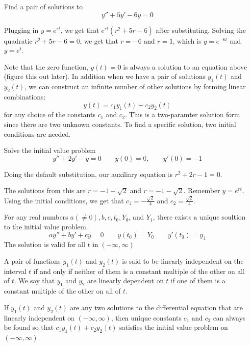 \documentclass[../diffeq.tex]{subfiles}
\begin{document}
\begin{example}
    Find a pair of solutions to 
    \[ y''+5y'-6y=0\]

    Plugging in $y=e^{rt}$, we get that $e^{rt}(r^2+5r-6)$ after substituting. Solving the quadratic $r^2+5r-6 =0$, we get that $r=-6$ and $r=1$, which is $y=e^{-6t}$ and $y=e^t$.
\end{example}

Note that the zero function, $y(t)=0$ is always a solution to an equation above (figure this out later). In addition when we have a pair of solutions $y_1(t)$ and $y_2(t)$, we can construct an infinite number of other solutions by forming linear combinations:
\[ y(t)=c_1y_1(t)+c_2y_2(t) \]
for any choice of the constants $c_1$ and $c_2$. This is a two-paramter solution form since there are two unknown constants. To find a specific solution, two initial conditions are needed.

\begin{example}
    Solve the initial value problem 
    \[ y''+2y'-y=0\qquad y(0)=0, \qquad y'(0)=-1 \]

    Doing the default substitution, our auxiliary equation is $r^2+2r-1=0$. 

    The solutions from this are $r=-1+\sqrt{2}$ and $r=-1-\sqrt{2}$. Remember $y=e^{rt}$. Using the initial conditions, we get that $c_1=-\frac{\sqrt{2}}{4}$ and $c_2=\frac{\sqrt{2}}{4}$.
\end{example}

\begin{theorem}
    For any real numbers $a(\neq 0),b,c,t_0,Y_0$, and $Y_1$, there exists a unique soultion to the initial value problem. 
    \[ ay''+by'+cy=0 \qquad y(t_0)=Y_0 \qquad y'(t_0)=y_1 \]
    The solution is valid for all $t$ in $(-\infty,\infty)$
\end{theorem}

\begin{definition}
    A pair of functions $y_1(t)$ and $y_2(t)$ is said to be linearly independent on the interval $t$ if and only if neither of them is a constant multiple of the other on all of $t$. We say that 
    $y_1$ and $y_2$ are linearly dependent on $t$ if one of them is a constant multiple of the other on all of $t$.
\end{definition}

\begin{theorem}
    If $y_1(t)$ and $y_2(t)$ are any two solutions to the differential equation that are linearly independent on $(-\infty,\infty)$, then unique constants $c_1$ and $c_2$ can always be found so that $c_1y_1(t)+c_2y_2(t)$ satisfies the initial value problem on $(-\infty,\infty)$.
\end{theorem}
\end{document}
